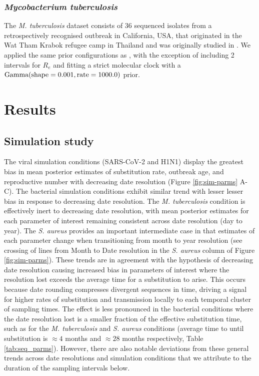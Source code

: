 \documentclass[11pt]{article}
\begin{document}
\begin{spacing}{1.5}
\subsubsection*{\textit{Mycobacterium tuberculosis}}
The \textit{M. tuberculosis} dataset consists of 36 sequenced isolates from a retrospectively recognised outbreak in California, USA, that originated in the Wat Tham Krabok refugee camp in Thailand and was originally studied in \citet{kuhnert_tuberculosis_2018}. We applied the same prior configurations as \citet{kuhnert_tuberculosis_2018}, with the exception of including 2 intervals for $R_e$ and fitting a strict molecular clock with a $\textnormal{Gamma}(\textnormal{shape}=0.001,\textnormal{rate}=1000.0)$ prior.

\section*{Results}
\subsection*{Simulation study}
The viral simulation conditions (SARS-CoV-2 and H1N1) display the greatest bias in mean posterior estimates of substitution rate, outbreak age, and reproductive number with decreasing date resolution (Figure \ref{fig:sim-parms} A-C). The bacterial simulation conditions exhibit  similar trend with lesser lesser bias in response to decreasing date resolution. The \textit{M. tuberculosis} condition is effectively inert to decreasing date resolution, with mean posterior estimates for each parameter of interest remaining consistent across date resolution (day to year). The \textit{S. aureus} provides an important intermediate case in that estimates of each parameter change when transitioning from month to year resolution (see crossing of lines from Month to Date resolution in the \textit{S. aureus} column of Figure \ref{fig:sim-parms}). These trends are in agreement with the hypothesis of decreasing date resolution causing increased bias in parameters of interest where the resolution lost exceeds the average time for a substitution to arise. This occurs because date rounding compresses divergent sequences in time, driving a signal for higher rates of substitution and transmission locally to each temporal cluster of sampling times.  The effect is less pronounced in the bacterial conditions where the date resolution lost is a smaller fraction of the effective substitution time, such as for the \textit{M. tuberculosis} and \textit{S. aureus} conditions (average time to until substitution is $\approx4$ months and $\approx28$ months respectively, Table \ref{tab:seq_parms}). However, there are also notable deviations from these general trends across date resolutions and simulation conditions that we attribute to the duration of the sampling intervals below.


\end{spacing}
\end{document}

